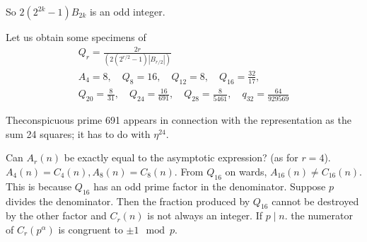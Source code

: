 So $2(2^{2k}-1) B_{2k}$ is an odd integer.

Let us obtain some specimens of 
\begin{gather*}
  Q_r = \frac{2r}{(2(2^{r/2}-1) |B_{r/2}|)}\\
  A_4 =8, \quad Q_8=16, \quad Q_{12}= 8, \quad Q_{16}= \frac{32}{17},\\
  Q_{20}= \frac{8}{31}, \quad Q_{24} = \frac{16}{691}, \quad Q_{28}=
  \frac{8}{5461}, \quad q_{32}= \frac{64}{929569} 
\end{gather*}

The\pageoriginale conspicuous prime 691 appears in connection with the
representation as the sum 24 squares; it has to do with $\eta^{24}$.

Can $A_r(n)$ be exactly equal to the asymptotic expression? (as for
$r=4$). $A_4(n)=C_4(n), A_8(n)=C_8(n)$. From $Q_{16}$ on wards,
$A_{16} (n) \neq C_{16} (n)$. This is because $Q_{16}$ has an odd
prime factor in the denominator. Suppose $p$ divides the
denominator. Then the fraction produced by $Q_{16}$ cannot be
destroyed by the other factor and $C_r (n)$ is not always an
integer. If $p \mid n$. the numerator of $C_{r}(p^\alpha)$ is congruent to
$\pm 1 \mod p$.


